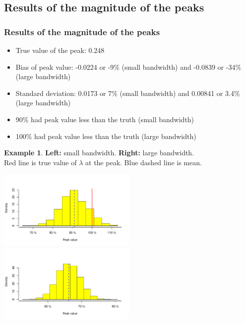 \documentclass[notheorems]{beamer}
\theoremstyle{definition}
\theoremstyle{example}
\newtheorem{example}{Example}
\begin{document}
\subsection{Results of the magnitude of the peaks}
\begin{frame}\frametitle{Results of the magnitude of the peaks}
    \footnotesize
    \begin{itemize}
        \item True value of the peak: 0.248
        \item Bias of peak value: -0.0224 or -9\% (small bandwidth) and -0.0839 or -34\% (large bandwidth)
        \item Standard deviation: 0.0173 or 7\% (small bandwidth) and 0.00841 or 3.4\% (large bandwidth)
        \item 90\% had peak value \alert{less than} the truth (small bandwidth)
        \item 100\% had peak value \alert{less than} the truth (large bandwidth)
    \end{itemize}
    \begin{example}{\tiny{\textbf{Left:} small bandwidth. \textbf{Right:} large bandwidth. \\
    {\color{red}Red} line is true value of $\lambda$ at the peak. {\color{blue}Blue dashed} line is mean.}}
    \centerline{
        \label{fig:peaks-values-hist}
        \centering
        \includegraphics[width=0.5\textwidth]{peaks-hist-values-undersmooth}
        \includegraphics[width=0.5\textwidth]{peaks-hist-values-oversmooth}
     }
    \end{example}
\end{frame}

\end{document}
